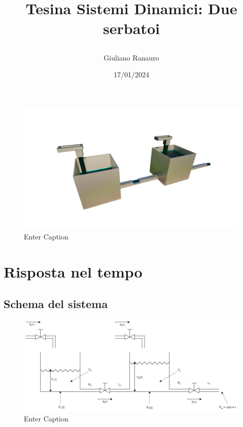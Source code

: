 \documentclass[
]{article}
\author{Giuliano Ranauro}
\date{17/01/2024}
\title{ \begin{huge}
\textbf{Tesina Sistemi Dinamici: Due serbatoi} 
\end{huge} }
\begin{document}
\maketitle


\begin{figure}
    \centering
    \includegraphics[width=0.9\linewidth]{images/ritagliata.png}
    \caption{Enter Caption}
    \label{fig:enter-label}
\end{figure}


\tableofcontents

\newpage

\hypertarget{schema-del-sistema}{%
\section{Risposta nel tempo}
\subsection{Schema del sistema}\label{schema-del-sistema}}

\begin{figure}
    \centering
    \includegraphics[width=1\linewidth]{images/DueSerbatoiSchemaLight.png}
    \caption{Enter Caption}
    \label{fig:enter-label}
\end{figure}
\end{document}
